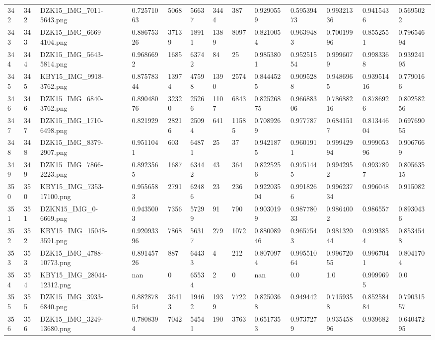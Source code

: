 \documentclass[11pt, a4paper, twoside]{report}
\begin{document}
\begin{longtable}[c]{@{}lllllllllllll@{}}
342 & 342 & DZK15\_IMG\_7011-5643.png & 0.72571063 & 5068 & 56637 & 3444 & 387 & 0.9290559 & 0.59539473 & 0.99321336 & 0.9415436 & 0.5695022 \\
343 & 343 & DZK15\_IMG\_6669-4104.png & 0.88675326 & 37139 & 18911 & 1389 & 8097 & 0.8210054 & 0.9639483 & 0.70019996 & 0.8552551 & 0.79654694 \\
344 & 344 & DZK15\_IMG\_5643-5814.png & 0.9686692 & 1685 & 63742 & 84 & 25 & 0.9853801 & 0.95251554 & 0.9996079 & 0.9983368 & 0.93924195 \\
345 & 345 & KBY15\_IMG\_9918-3762.png & 0.87578344 & 13974 & 47598 & 1390 & 2574 & 0.8444525 & 0.9095288 & 0.9486965 & 0.93951416 & 0.7790166 \\
346 & 346 & DZK15\_IMG\_6840-3762.png & 0.89048076 & 32320 & 25266 & 1107 & 6843 & 0.82526875 & 0.96688306 & 0.78688216 & 0.8786926 & 0.80258256 \\
347 & 347 & DZK15\_IMG\_1710-6498.png & 0.821929 & 28216 & 25094 & 641 & 11585 & 0.7089269 & 0.977787 & 0.6841517 & 0.81344604 & 0.69769055 \\
348 & 348 & DZK15\_IMG\_8379-2907.png & 0.9511041 & 603 & 64871 & 25 & 37 & 0.9421875 & 0.9601911 & 0.99942994 & 0.99905396 & 0.9067669 \\
349 & 349 & DZK15\_IMG\_7866-2223.png & 0.8923565 & 1687 & 63442 & 43 & 364 & 0.8225256 & 0.9751445 & 0.9942952 & 0.9937897 & 0.80563515 \\
350 & 350 & KBY15\_IMG\_7353-17100.png & 0.9556583 & 2791 & 62486 & 23 & 236 & 0.92203504 & 0.9918266 & 0.99623734 & 0.996048 & 0.915082 \\
351 & 351 & DZKN15\_IMG\_0-6669.png & 0.9435003 & 7356 & 57299 & 91 & 790 & 0.9030199 & 0.98778033 & 0.9864002 & 0.986557 & 0.8930436 \\
352 & 352 & KBY15\_IMG\_15048-3591.png & 0.92093396 & 7868 & 56317 & 279 & 1072 & 0.88008946 & 0.9657543 & 0.98132044 & 0.9793854 & 0.8534548 \\
353 & 353 & DZK15\_IMG\_4788-10773.png & 0.89145726 & 887 & 64433 & 4 & 212 & 0.8070974 & 0.99551064 & 0.99672055 & 0.9967041 & 0.8041704 \\
354 & 354 & KBY15\_IMG\_28044-12312.png & nan & 0 & 65534 & 2 & 0 & nan & 0.0 & 1.0 & 0.9999695 & 0.0 \\
355 & 355 & DZK15\_IMG\_3933-6840.png & 0.88287854 & 36413 & 19462 & 1939 & 7722 & 0.8250368 & 0.949442 & 0.7159358 & 0.85258484 & 0.79031557 \\
356 & 356 & DZK15\_IMG\_3249-13680.png & 0.7808394 & 7042 & 54541 & 190 & 3763 & 0.6517353 & 0.9737279 & 0.93545896 & 0.939682 & 0.64047295 \\

\end{longtable}
\end{document}
